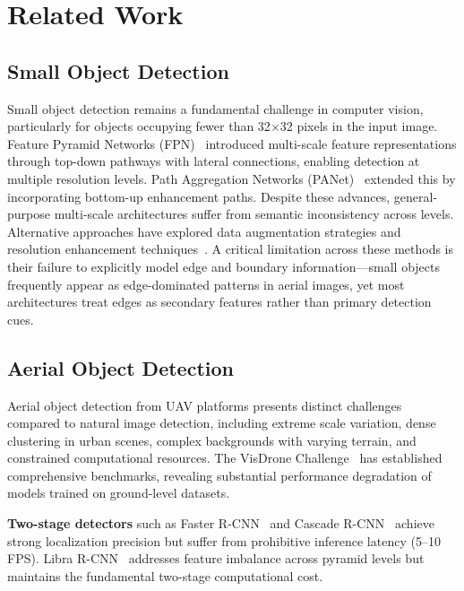 \documentclass[preprint,12pt]{elsarticle}
\begin{document}
\section{Related Work}
\label{sec:related}

\subsection{Small Object Detection}

Small object detection remains a fundamental challenge in computer vision,
particularly for objects occupying fewer than 32$\times$32 pixels in the input
image. Feature Pyramid Networks (FPN)~\cite{fpn} introduced multi-scale feature
representations through top-down pathways with lateral connections, enabling
detection at multiple resolution levels. Path Aggregation Networks
(PANet)~\cite{panet} extended this by incorporating bottom-up enhancement paths.
Despite these advances, general-purpose multi-scale architectures suffer from
semantic inconsistency across levels. Alternative approaches have explored
data augmentation strategies and resolution enhancement techniques~\cite{
sr-detection}. A critical limitation across these methods is their failure to
explicitly model edge and boundary information---small objects frequently appear
as edge-dominated patterns in aerial images, yet most architectures treat edges
as secondary features rather than primary detection cues.

\subsection{Aerial Object Detection}

Aerial object detection from UAV platforms presents distinct challenges compared
to natural image detection, including extreme scale variation, dense clustering in
urban scenes, complex backgrounds with varying terrain, and constrained
computational resources. The VisDrone Challenge~\cite{visdrone2019,visdrone2018}
has established comprehensive benchmarks, revealing substantial performance
degradation of models trained on ground-level datasets.

\textbf{Two-stage detectors} such as Faster R-CNN~\cite{faster-rcnn} and Cascade
R-CNN~\cite{cascade-rcnn} achieve strong localization precision but suffer from
prohibitive inference latency (5--10 FPS). Libra R-CNN~\cite{libra-rcnn} addresses
feature imbalance across pyramid levels but maintains the fundamental two-stage
computational cost.
\end{document}
